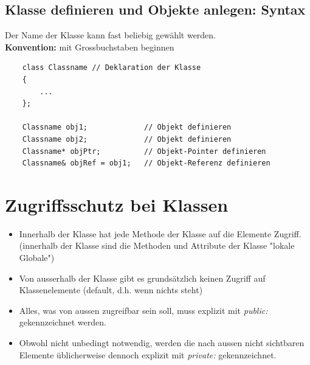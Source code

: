 \clearpage
\subsection{Klasse definieren und Objekte anlegen: Syntax}
Der Name der Klasse kann fast beliebig gewählt werden.\\
\textbf{Konvention:} mit Grossbuchstaben beginnen
\noindent
\begin{minipage}{0.7\linewidth}
	\begin{lstlisting}
	class Classname	// Deklaration der Klasse
	{
		...
	};
	
	Classname obj1;				// Objekt definieren
	Classname obj2;				// Objekt definieren
	Classname* objPtr;			// Objekt-Pointer definieren
	Classname& objRef = obj1;	// Objekt-Referenz definieren
	\end{lstlisting}
\end{minipage}

\section{Zugriffsschutz bei Klassen}
\begin{itemize}
	\item Innerhalb der Klasse hat jede Methode der Klasse auf die Elemente Zugriff. (innerhalb der Klasse sind die Methoden und Attribute der Klasse "lokale Globale")
	\item Von ausserhalb der Klasse gibt es grundsätzlich keinen Zugriff auf Klassenelemente (default, d.h. wenn nichts steht)
	\item Alles, was von aussen zugreifbar sein soll, muss explizit mit \emph{public:} gekennzeichnet werden.
	\item Obwohl nicht unbedingt notwendig, werden die nach aussen nicht sichtbaren Elemente üblicherweise dennoch explizit mit \emph{private:} gekennzeichnet.
\end{itemize}

